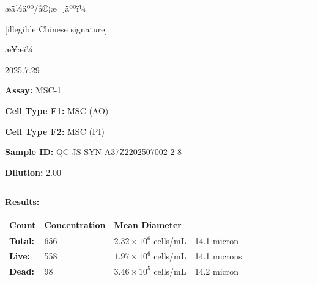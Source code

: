 \documentclass[UTF8,10pt,a4paper,fontset=fandol]{ctexart}
\newcommand{\fieldvalue}[1]{#1}
\newcommand{\handwritten}[1]{#1}
\begin{document}
\begin{center}
\begin{center}
\vfill

æä½äºº/å®¡æ ¸äººï¼

\fieldvalue{\handwritten{[illegible Chinese signature]}}

\medskip
æ¥æï¼

\fieldvalue{\handwritten{2025.7.29}}

\newpage

\noindent
\textbf{Assay:} \fieldvalue{MSC-1}

\noindent
\textbf{Cell Type F1:} \fieldvalue{MSC (AO)}

\noindent
\textbf{Cell Type F2:} \fieldvalue{MSC (PI)}

\noindent
\textbf{Sample ID:} \fieldvalue{QC-JS-SYN-A37Z2202507002-2-8}

\noindent
\textbf{Dilution:} \fieldvalue{2.00}

\bigskip
\noindent\rule{\textwidth}{0.4pt}

\noindent\textbf{Results:}

\medskip
\small
\begin{tabularx}{\textwidth}{@{}>{\RaggedRight\arraybackslash}X
>{\RaggedRight\arraybackslash}X
>{\RaggedRight\arraybackslash}X@{}}
\textbf{Count} & \textbf{Concentration} & \textbf{Mean Diameter} \\[2pt]
\hline
\textbf{Total:} &
\fieldvalue{656} &
\fieldvalue{$2.32 \times 10^{6}$ cells/mL}
&
\fieldvalue{14.1 micron}
\\[4pt]
\textbf{Live:} &
\fieldvalue{558} &
\fieldvalue{$1.97 \times 10^{6}$ cells/mL}
&
\fieldvalue{14.1 microns}
\\[4pt]
\textbf{Dead:} &
\fieldvalue{98} &
\fieldvalue{$3.46 \times 10^{5}$ cells/mL}
&
\fieldvalue{14.2 micron}
\end{tabularx}


\end{center}
\end{center}
\end{document}
